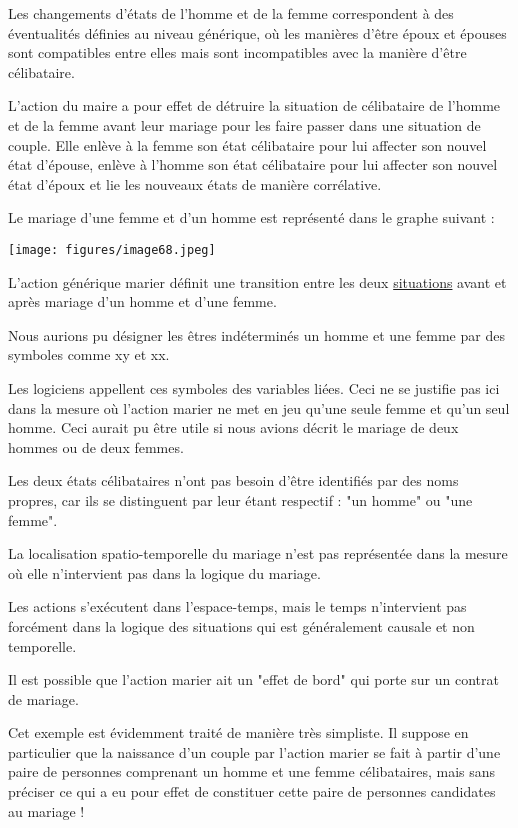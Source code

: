 \documentclass[a4paper, 12pt, openright, french]{book}
\begin{document}
Les changements d'états de l'homme et de
la femme correspondent à des éventualités définies au niveau générique,
où les manières d'être époux et épouses sont compatibles
entre elles mais sont incompatibles avec la manière
d'être célibataire.

L'action du maire a pour effet de détruire la situation
de célibataire de l'homme et de la femme avant leur
mariage pour les faire passer dans une situation de couple. Elle enlève
à la femme son état célibataire pour lui affecter son nouvel état
d'épouse, enlève à l'homme son état
célibataire pour lui affecter son nouvel état d'époux et
lie les nouveaux états de manière corrélative.

Le mariage d'une femme et d'un homme est
représenté dans le graphe suivant :

\texttt{[image: figures/image68.jpeg]}

L'action générique marier définit une transition entre
les deux \uline{situations} avant et après mariage d'un
homme et d'une femme.

Nous aurions pu désigner les êtres indéterminés un homme et une femme
par des symboles comme xy et xx.

Les logiciens appellent ces symboles des variables liées. Ceci ne se
justifie pas ici dans la mesure où l'action marier ne
met en jeu qu'une seule femme et qu'un
seul homme. Ceci aurait pu être utile si nous avions décrit le mariage
de deux hommes ou de deux femmes.

Les deux états célibataires n'ont pas besoin
d'être identifiés par des noms propres, car ils se
distinguent par leur étant respectif : "un homme" ou "une femme".

La localisation spatio-temporelle du mariage n'est pas
représentée dans la mesure où elle n'intervient pas dans
la logique du mariage.

Les actions s'exécutent dans
l'espace-temps, mais le temps
n'intervient pas forcément dans la logique des
situations qui est généralement causale et non temporelle.

Il est possible que l'action marier ait un "effet de
bord" qui porte sur un contrat de mariage.

Cet exemple est évidemment traité de manière très simpliste. Il suppose
en particulier que la naissance d'un couple par
l'action marier se fait à partir d'une
paire de personnes comprenant un homme et une femme célibataires, mais
sans préciser ce qui a eu pour effet de constituer cette paire de
personnes candidates au mariage !
\end{document}
